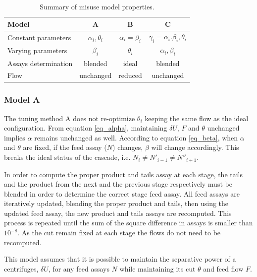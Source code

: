 \begin{table}[htb]
\centering
  \caption{Summary of misuse model properties.}
\begin{tabular}{l|ccc}
\toprule

Model                &    A                 & B                  & C  \\
\midrule
Constant parameters  & $\alpha_i, \theta_i$ & $\alpha_i=\beta_i$ & $\gamma_i=\alpha_i .\beta_i, \theta_i$       \\
Varying parameters   & $\beta_i$            & $\theta_i$         & $\alpha_i, \beta_i$                     \\
Assays determination & blended              & ideal              & blended                  \\
Flow                 & unchanged            & reduced            & unchanged       \\

\bottomrule
\end{tabular}
  \label{tab:models}
\end{table}

\subsubsection{Model A}

The tuning method A does not re-optimize $\theta_i$ keeping the same flow as the
ideal configuration. From equation \eqref{eq_alpha}, maintaining $\delta U$, $F$
and $\theta$ unchanged implies $\alpha$ remains unchanged as well. According to
equation \eqref{eq_beta}, when $\alpha$ and $\theta$ are fixed, if the feed
assay ($N$) changes, $\beta$ will change accordingly.  This breaks the
ideal status of the cascade, i.e. $N_{i} \neq N'_{i-1} \neq N''_{i+1}$.


In order to compute the proper product and tails assay at each stage, the tails
and the product from the next and the previous stage respectively must be
blended in order to determine the correct stage feed assay. All feed assays are
iteratively updated, blending the proper product and tails, then using the
updated feed assay, the new product and tails assays are recomputed. This
process is repeated until the sum of the square difference in assays is smaller
than $10^{-8}$.  As the cut remain fixed at each stage the flows do not need to
be recomputed.

This model assumes that it is possible to maintain the separative power of a
centrifuges, $\delta U$, for any feed assays $N$ while maintaining its cut
$\theta$ and feed flow $F$.

